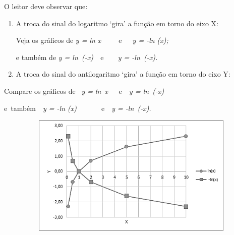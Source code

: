 \documentclass[12pt]{article}
\begin{document}
\begin{adjustwidth}{0.79in}{0.0in}
\begin{justify}
O leitor deve observar que:
\end{justify}\par

\end{adjustwidth}

\begin{enumerate}
	\item A troca do sinal do logaritmo ‘gira’ a função em torno do eixo X: \par

Veja os gráficos de \textit{y = ln x}\ \ \ \ \ e\ \ \   \textit{y = -ln (x); }\par

e também de\textit{ y = ln\ (-x)\ \   }e\textit{\ \  }\ \  \textit{y = -ln\ (-x).  }\  \par

	\item  A troca do sinal do antilogaritmo ‘gira’ a função em torno do eixo Y:
\end{enumerate}\par

\begin{adjustwidth}{0.79in}{0.0in}
Compare os gráficos de \  \textit{y = ln\ x\ \ \   }e\textit{\ \  y = ln\ (-x)  }\par

\end{adjustwidth}

\begin{adjustwidth}{0.79in}{0.0in}
e\ também\ \   \textit{y = -ln (x)}\ \ \ \ \ \ \ e\ \   \textit{y = -ln\ (-x).  }\  \par

\end{adjustwidth}




\begin{figure}[H]
	\begin{Center}
		\includegraphics[width=4.49in,height=2.29in]{./media/image8.png}
	\end{Center}
\end{figure}
\end{document}
